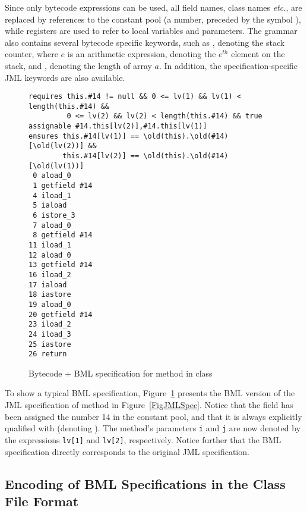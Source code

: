 Since only bytecode expressions can be used, all field names, class
names \emph{etc.}, are replaced by references to the constant pool (a
number, preceded by the symbol \codeHook{\#}), while registers are
used to refer to local variables and parameters. The grammar also
contains several bytecode specific keywords, such as ,
denoting the stack counter,  where \(e\) is an
arithmetic expression, denoting the \(e^{th}\) element on the stack, and
, denoting the length of array \(a\). In
addition, the specification-specific JML keywords are also available.




\begin{figure}[t]
{\small
\begin{verbatim}
requires this.#14 != null && 0 <= lv(1) && lv(1) < length(this.#14) &&
         0 <= lv(2) && lv(2) < length(this.#14) && true
assignable #14.this[lv(2)],#14.this[lv(1)]
ensures this.#14[lv(1)] == \old(this).\old(#14)[\old(lv(2))] && 
        this.#14[lv(2)] == \old(this).\old(#14)[\old(lv(1))]
 0 aload_0
 1 getfield #14 
 4 iload_1
 5 iaload
 6 istore_3
 7 aload_0
 8 getfield #14 
11 iload_1
12 aload_0
13 getfield #14 
16 iload_2
17 iaload
18 iastore
19 aload_0
20 getfield #14 
23 iload_2
24 iload_3
25 iastore
26 return
\end{verbatim}
}
\vspace*{-1em}\caption{Bytecode + BML specification for method  in class }\label{FigBMLSpec}
\end{figure}

To show a typical BML specification, Figure~\ref{FigBMLSpec} presents
the BML version of the JML specification of method
 in Figure~\ref{FigJMLSpec}. 
Notice that the field  has been assigned the number 14
in the constant pool, and that it is always explicitly qualified with
 (denoting ). The method's parameters
\texttt{i} and \texttt{j} are now denoted by the expressions
\texttt{lv[1]} and \texttt{lv[2]}, respectively. Notice further that
the BML specification directly corresponds to the original JML
specification.


 
\subsection{Encoding of BML Specifications in the Class File Format}

